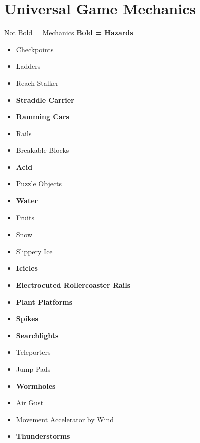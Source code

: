 \documentclass[12pt]{article}
\begin{document}
\section{Universal Game Mechanics}
\noindent Not Bold = Mechanics \newline
\textbf{Bold = Hazards}
\begin{multicols}{2}
\begin{itemize}[noitemsep]
\item Checkpoints
\item Ladders
\item Reach Stalker
\item \textbf{Straddle Carrier}
\item \textbf{Ramming Cars}
\item Rails
\item Breakable Blocks
\item \textbf{Acid}
\item Puzzle Objects
\item \textbf{Water}
\item Fruits
\item Snow
\item Slippery Ice
\item \textbf{Icicles}
\item \textbf{Electrocuted Rollercoaster Rails}
\item \textbf{Plant Platforms}
\item \textbf{Spikes}
\item \textbf{Searchlights}
\item Teleporters
\item Jump Pads
\item \textbf{Wormholes}
\item Air Gust
\item Movement Accelerator by Wind
\item \textbf{Thunderstorms}
\end{itemize}
\end{multicols}
\newpage
\end{document}
